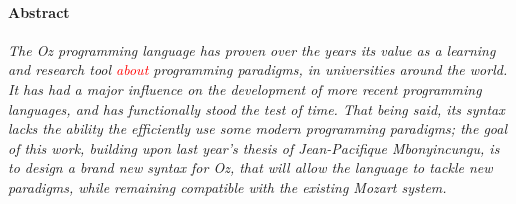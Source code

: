 
\paragraph{Abstract}
\textit{
The Oz programming language has proven over the years its value as a learning and research tool \textcolor{red}{about} programming paradigms, in universities around the world.
It has had a major influence on the development of more recent programming languages, and has functionally stood the test of time.
That being said, its syntax lacks the ability the efficiently use some modern programming paradigms;
the goal of this work, building upon last year's thesis of Jean-Pacifique Mbonyincungu, is to design a brand new syntax for Oz, that will allow the language to tackle new paradigms, while remaining compatible with the existing Mozart system.
}
